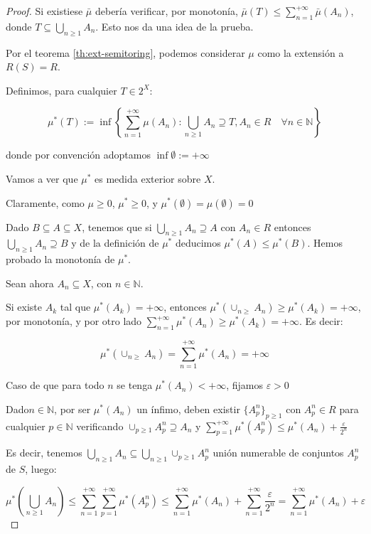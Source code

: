 \begin{proof}
 Si existiese $\bar{\mu}$ debería verificar, por monotonía, $\bar{\mu}(T) \le \sum_{n=1}^{+\infty} \bar{\mu}(A_n)$, 
 donde $T \subseteq \bigcup_{n\ge 1} A_n$. Esto nos da una idea de la prueba.
 
 Por el teorema \ref{th:ext-semitoring}, podemos considerar $\mu$ como la extensión a $R(S)=R$.
 
 Definimos, para cualquier $T\in 2^X$:
 
 \[\mu^\ast(T):= \inf\left\{\sum_{n=1}^{+\infty} \mu(A_n): \bigcup_{n\ge 1} A_n \supseteq T,
                 A_n\in R \quad \forall n\in\mathbb{N}\right\}\]

 donde por convención adoptamos $\inf \emptyset := +\infty$
 
 Vamos a ver que $\mu^\ast$ es medida exterior sobre $X$.
 
 Claramente, como $\mu \ge 0$, $\mu^\ast \ge 0$, y $\mu^\ast(\emptyset) = \mu(\emptyset) = 0$
 
 Dado $B\subseteq A \subseteq X$, tenemos que si $\bigcup_{n\ge 1} A_n \supseteq A$ con $A_n\in R$
 entonces $\bigcup_{n\ge 1} A_n \supseteq B$ y de la definición de $\mu^\ast$ deducimos $\mu^\ast(A) \le \mu^\ast(B)$.
 Hemos probado la monotonía de $\mu^\ast$.
 
 Sean ahora $A_n \subseteq X$, con $n\in \mathbb{N}$.
 
 Si existe $A_k$ tal que $\mu^\ast(A_k) = +\infty$, entonces $\mu^\ast(\cup_{n\ge} A_n) \ge \mu^\ast(A_k) = +\infty$, 
 por monotonía, y por otro lado $\sum_{n=1}^{+\infty} \mu^\ast(A_n) \ge \mu^\ast(A_k) = +\infty$. Es decir:

 \[\mu^\ast(\cup_{n\ge} A_n) = \sum_{n=1}^{+\infty} \mu^\ast(A_n) = +\infty\]
 
 Caso de que para todo $n$ se tenga $\mu^\ast(A_n) < +\infty$, fijamos $\varepsilon > 0$
 
 Dado$n\in \mathbb{N}$, por ser $\mu^\ast(A_n)$ un ínfimo, deben existir $\{A_p^n\}_{p\ge 1}$ con 
 $A_p^n \in R$ para cualquier $p\in\mathbb{N}$ verificando $\cup_{p\ge 1} A_p^n \supseteq A_n$ y
 $\sum_{p=1}^{+\infty} \mu^\ast(A_p^n) \le \mu^\ast(A_n) + \frac{\varepsilon}{2^n}$
 
 Es decir, tenemos $\bigcup_{n\ge 1} A_n \subseteq \bigcup_{n\ge 1} \cup_{p\ge 1} A_p^n$ unión numerable
 de conjuntos $A_p^n$ de $S$, luego:
 
 \[\mu^\ast \left(\bigcup_{n\ge 1} A_n \right) \le \sum_{n=1}^{+\infty} \sum_{p=1}^{+\infty} \mu^\ast(A_p^n)
   \le \sum_{n=1}^{+\infty}\mu^\ast(A_n) + \sum_{n=1}^{+\infty}\frac{\varepsilon}{2^n} = 
   \sum_{n=1}^{+\infty}\mu^\ast(A_n) + \varepsilon\]
 

\end{proof}
